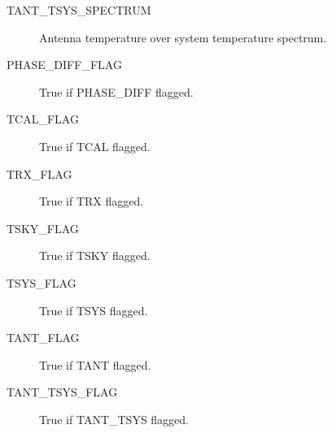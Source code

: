 \documentclass{article}
\begin{document}
\begin{description}
\item[TANT\_TSYS\_SPECTRUM] Antenna temperature over system
temperature spectrum.

\item[PHASE\_DIFF\_FLAG] True if PHASE\_DIFF flagged.

\item[TCAL\_FLAG] True if TCAL flagged.

\item[TRX\_FLAG] True if TRX flagged.

\item[TSKY\_FLAG] True if TSKY flagged.

\item[TSYS\_FLAG] True if TSYS flagged.

\item[TANT\_FLAG] True if TANT flagged.

\item[TANT\_TSYS\_FLAG] True if TANT\_TSYS flagged.

\end{description}
\end{document}

